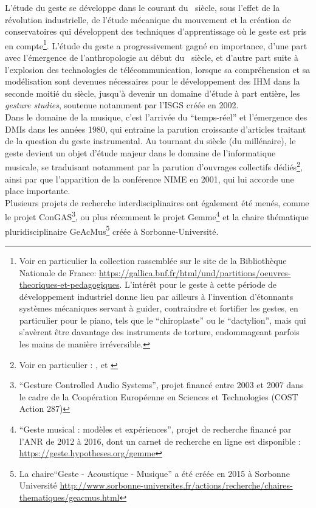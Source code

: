 \indent L'étude du geste se développe dans le courant du ~siècle, sous l'effet de la révolution industrielle, de l'étude mécanique du mouvement et la création de conservatoires qui développent des techniques d'apprentissage où le geste est pris en compte\footnote{Voir en particulier la collection rassemblée sur le site de la Bibliothèque Nationale de France: \url{https://gallica.bnf.fr/html/und/partitions/oeuvres-theoriques-et-pedagogiques}. L'intérêt pour le geste à cette période de développement industriel donne lieu par ailleurs à l'invention d'étonnants systèmes mécaniques servant à guider, contraindre et fortifier les gestes, en particulier pour le piano, tels que le ``chiroplaste'' ou le ``dactylion'', mais qui s'avèrent être davantage des instruments de torture, endommageant parfois les mains de manière irréversible.}. L'étude du geste a progressivement gagné en importance, d'une part avec l'émergence de l'anthropologie au début du ~siècle, et d'autre part suite à l'explosion des technologies de télécommunication, lorsque sa compréhension et sa modélisation sont devenues nécessaires pour le développement des \gls{IHM} dans la seconde moitié du siècle, jusqu'à devenir un domaine d'étude à part entière, les \textit{gesture studies}, soutenue notamment par l'\gls{ISGS} créée en 2002.\\
\indent Dans le domaine de la musique, c'est l'arrivée du ``temps-réel'' et l'émergence des \glspl{DMI} dans les années 1980, qui entraine la parution croissante d'articles traitant de la question du geste instrumental. Au tournant du siècle (du millénaire), le geste devient un objet d'étude majeur dans le domaine de l'informatique musicale, se traduisant notamment par la parution d'ouvrages collectifs dédiés\footnote{Voir en particulier : \cite{genevois_les_1999}, \cite{wanderley_trends_2000} et \cite{godoy_musical_2010}}, ainsi par que l'apparition de la conférence \gls{NIME} en 2001, qui lui accorde une place importante.\\
\indent Plusieurs projets de recherche interdisciplinaires ont également été menés, comme le projet ConGAS\footnote{``Gesture Controlled Audio Systems'', projet financé entre 2003 et 2007 dans le cadre de la Coopération Européenne en Sciences et Technologies (COST Action 287)}, ou plus récemment le projet Gemme\footnote{``Geste musical : modèles et expériences'', projet de recherche financé par l'ANR de 2012 à 2016, dont un carnet de recherche en ligne est disponible : \url{https://geste.hypotheses.org/gemme}} et la chaire thématique pluridisciplinaire GeAcMus\footnote{La chaire``Geste - Acoustique - Musique'' a été créée en 2015 à Sorbonne Université \url{http://www.sorbonne-universites.fr/actions/recherche/chaires-thematiques/geacmus.html}} créée à Sorbonne-Université.

